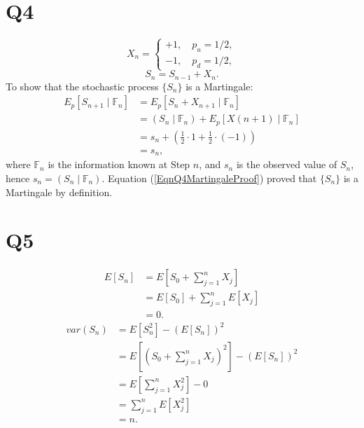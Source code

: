 \documentclass[final,3p,times]{elsarticle}
\begin{document}
\section{Q4}
	\begin{equation}
		X_n=
		\begin{cases}
			+1, \quad p_u=1/2, \\
			-1, \quad p_d=1/2,
		\end{cases}
	\end{equation}
	\begin{equation}
		S_n=S_{n-1}+X_n.
	\end{equation}
	To show that the stochastic process $\{S_n\}$ is a Martingale:
	\begin{equation}
		\label{EqnQ4MartingaleProof}
		\begin{split}
			E_p[S_{n+1}\mid\mathbb{F}_n] &= E_p[S_n+X_{n+1}\mid\mathbb{F}_n] \\
			&= \left(S_n\mid\mathbb{F}_n\right) + E_p[X(n+1)\mid\mathbb{F}_n] \\
			&= s_n + \left(\frac{1}{2}\cdot 1+\frac{1}{2}\cdot (-1)\right) \\
			&= s_n
			,
		\end{split}
	\end{equation}
	where $\mathbb{F}_n$ is the information known at Step $n$, and $s_n$ is the observed value of $S_n$, hence $s_n = \left(S_n\mid\mathbb{F}_n\right)$. Equation (\ref{EqnQ4MartingaleProof}) proved that $\{S_n\}$ is a Martingale by definition.
	
\section{Q5}
	\begin{equation}
		\begin{split}
			E[S_n]&=E[S_0+\sum_{j=1}^{n} X_j] \\
			&=E[S_0]+\sum_{j=1}^{n} E[X_j] \\
			&=0
			.
		\end{split}
	\end{equation}
	\begin{equation}
		\begin{split}
			var(S_n)&=E[S_n^2]-\left(E[S_n]\right)^2 \\
			&=E[\left(S_0+\sum_{j=1}^{n}X_j\right)^2]-\left(E[S_n]\right)^2 \\
			&=E[\sum_{j=1}^{n} X_j^2] - 0 \\
			&=\sum_{j=1}^{n} E[X_j^2] \\
			&= n
			.
		\end{split}
	\end{equation}
	
\end{document}

